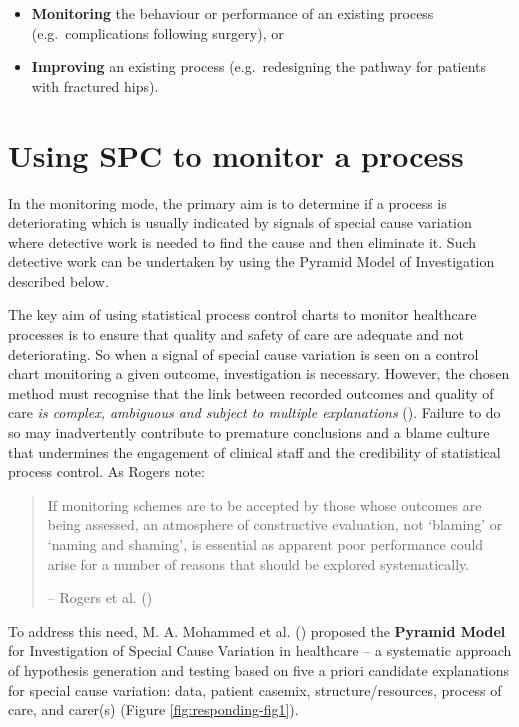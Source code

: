 \documentclass[
]{book}
\providecommand{\tightlist}{%
  \setlength{\itemsep}{0pt}\setlength{\parskip}{0pt}}
\begin{document}
\begin{itemize}
\tightlist
\item
  \textbf{Monitoring} the behaviour or performance of an existing process (e.g.~complications following surgery), or
\item
  \textbf{Improving} an existing process (e.g.~redesigning the pathway for patients with fractured hips).
\end{itemize}

\section{Using SPC to monitor a process}\label{using-spc-to-monitor-a-process}

In the monitoring mode, the primary aim is to determine if a process is deteriorating which is usually indicated by signals of special cause variation where detective work is needed to find the cause and then eliminate it. Such detective work can be undertaken by using the Pyramid Model of Investigation described below.

The key aim of using statistical process control charts to monitor healthcare processes is to ensure that quality and safety of care are adequate and not deteriorating. So when a signal of special cause variation is seen on a control chart monitoring a given outcome, investigation is necessary. However, the chosen method must recognise that the link between recorded outcomes and quality of care \emph{is complex, ambiguous and subject to multiple explanations} (). Failure to do so may inadvertently contribute to premature conclusions and a blame culture that undermines the engagement of clinical staff and the credibility of statistical process control. As Rogers note:

\begin{quote}
If monitoring schemes are to be accepted by those whose outcomes are being assessed, an atmosphere of constructive evaluation, not `blaming' or `naming and shaming', is essential as apparent poor performance could arise for a number of reasons that should be explored systematically.

-- Rogers et al. ()
\end{quote}

To address this need, M. A. Mohammed et al. () proposed the \textbf{Pyramid Model} for Investigation of Special Cause Variation in healthcare -- a systematic approach of hypothesis generation and testing based on five a priori candidate explanations for special cause variation: data, patient casemix, structure/resources, process of care, and carer(s) (Figure \ref{fig:responding-fig1}).
\end{document}

